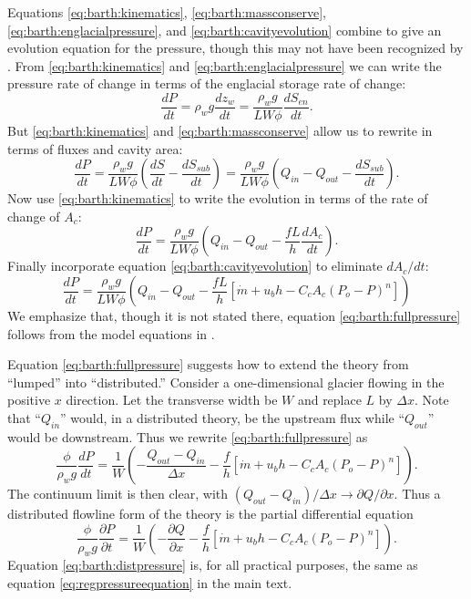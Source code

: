 \documentclass[11pt,final]{amsart}
\begin{document}
Equations \eqref{eq:barth:kinematics}, \eqref{eq:barth:massconserve}, \eqref{eq:barth:englacialpressure}, and \eqref{eq:barth:cavityevolution} combine to give an evolution equation for the pressure, though this may not have been recognized by \cite{Bartholomausetal2011}.  From \eqref{eq:barth:kinematics} and \eqref{eq:barth:englacialpressure} we can write the pressure rate of change in terms of the englacial storage rate of change:
	$$\frac{dP}{dt} = \rho_w g \frac{dz_w}{dt} = \frac{\rho_w g}{L W \phi} \frac{d S_{en}}{dt}.$$
But \eqref{eq:barth:kinematics} and \eqref{eq:barth:massconserve}  allow us to rewrite in terms of fluxes and cavity area:
    $$\frac{dP}{dt} = \frac{\rho_w g}{L W \phi} \left(\frac{d S}{dt} - \frac{d S_{sub}}{dt}\right) = \frac{\rho_w g}{L W \phi} \left(Q_{in} - Q_{out} - \frac{d S_{sub}}{dt}\right).$$
Now use \eqref{eq:barth:kinematics} to write the evolution in terms of the rate of change of $A_c$:
    $$\frac{dP}{dt} = \frac{\rho_w g}{L W \phi} \left(Q_{in} - Q_{out} - \frac{f L }{h} \frac{d A_c}{dt}\right).$$
Finally incorporate equation \eqref{eq:barth:cavityevolution} to eliminate $dA_c/dt$:
\begin{equation}
\frac{dP}{dt} = \frac{\rho_w g}{L W \phi} \left(Q_{in} - Q_{out} - \frac{f L }{h} \left[\dot m + u_b h - C_c A_c (P_o-P)^n\right]\right)  \label{eq:barth:fullpressure}
\end{equation}
We emphasize that, though it is not stated there, equation \eqref{eq:barth:fullpressure} follows from the model equations in \cite{Bartholomausetal2011}.

Equation \eqref{eq:barth:fullpressure} suggests how to extend the \cite{Bartholomausetal2011} theory from ``lumped'' into ``distributed.''  Consider a one-dimensional glacier flowing in the positive $x$ direction.  Let the transverse width be $W$ and replace $L$ by $\Delta x$.  Note that ``$Q_{in}$'' would, in a distributed theory, be the upstream flux while ``$Q_{out}$'' would be downstream.  Thus we rewrite \eqref{eq:barth:fullpressure} as
\begin{equation*}
\frac{\phi}{\rho_w g}\frac{dP}{dt} = \frac{1}{W} \left(- \frac{Q_{out} - Q_{in}}{\Delta x} - \frac{f}{h} \left[\dot m + u_b h - C_c A_c (P_o-P)^n\right]\right).
\end{equation*}
The continuum limit is then clear, with $(Q_{out} - Q_{in})/\Delta x \to \partial Q/\partial x$.  Thus a distributed flowline form of the \cite{Bartholomausetal2011} theory is the partial differential equation
\begin{equation}
\frac{\phi}{\rho_w g} \frac{\partial P}{\partial t} = \frac{1}{W} \left(- \frac{\partial Q}{\partial x} - \frac{f}{h} \left[\dot m + u_b h - C_c A_c (P_o-P)^n\right]\right).  \label{eq:barth:distpressure}
\end{equation}
Equation \eqref{eq:barth:distpressure} is, for all practical purposes, the same as equation \eqref{eq:regpressureequation} in the main text.
\end{document}
